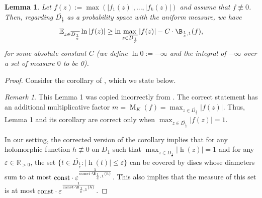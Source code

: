 \documentclass[reqno]{amsart}
\theoremstyle{plain}
\newtheorem{Lem}[Cor]{Lemma}
\theoremstyle{definition}
\theoremstyle{remark}
\newtheorem{Rem}[Cor]{Remark}
\theoremstyle{plain}
\begin{document}
\begin{Lem}\label{Lemma average is like maximum minus Bernstein index}
Let $f(z):=\max(|f_1(z)|,...,|f_k(z)|)$ and assume that $f\not\equiv 0$. Then, regarding $\overline{D_\frac1e}$ as a probability space with the uniform measure, we have
\[
    \operatorname{\mathbb E}_{z\in\overline{D_\frac1e}}\ln|f(z)|
        \geq
\ln\max_{z\in\overline{D_\frac1e}}|f(z)|-C\cdot\B_{\frac1e,1}(f)
,\]
for some absolute constant $C$ (we define $\ln 0:=-\infty$ and the integral of $-\infty$ over a set of measure $0$ to be 0).
\end{Lem}

\begin{proof}
Consider the corollary of \cite[Lemma 1]{NovikovYakovenko1997AComplexAnalogOfRolle'sTheoremAndPolynomialEnvelopesOfIrreducibleDifferentialEquationsInTheComplexDomain}, which we state below.

\begin{Rem}\label{Remark issue with the lemma}
This Lemma 1 was copied incorrectly from \cite[Lemma 3]{IlyashenkoYakovenko1996CountingRealZerosOfAnalyticFunctionsSatisfyingLinearOrdinaryDifferentialEquations}. The correct statement has an additional multiplicative factor $m=\operatorname*{M}_K(f)=\max_{z\in \overline{D_\frac1e}}|f(z)|$. Thus, Lemma 1 and its corollary are correct only when $\max_{z\in\overline{D_\frac1e}}|f(z)|=1$.
\end{Rem}

In our setting, the corrected version of the corollary implies that for any holomorphic function $h\not\equiv 0$ on $\overline{D_1}$ such that $\max_{z\in\overline{D_\frac1e}}|\operatorname{h}(z)|=1$ and for any $\varepsilon\in\mathbb R_{>0}$, the set $\{t\in \overline{D_\frac1e}:|\operatorname{h}(t)|\leq\varepsilon\}$ can be covered by discs whose diameters sum to at most $\mathrm{const}\cdot\varepsilon^{\frac1{\mathrm{const}\cdot\B_{\frac1e,1}(h)}}$. This also implies that the measure of this set is at most $\mathrm{const}\cdot\varepsilon^{\frac1{\mathrm{const}\cdot\B_{\frac1e,1}(h)}}$.


\end{proof}
\end{document}

